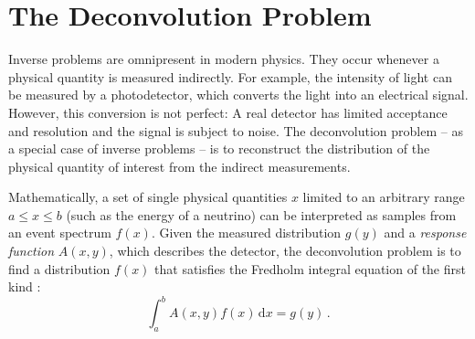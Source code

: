 \section{The Deconvolution Problem} %
Inverse problems are omnipresent in modern physics.
They occur whenever a physical quantity is measured indirectly.
For example,
the intensity of light can be measured by a photodetector,
  which converts the light into an electrical signal.
However,
this conversion is not perfect:
A real detector has limited acceptance and resolution
and the signal is subject to noise.
%
The deconvolution problem
  – as a special case of inverse problems –
  is to reconstruct
    the distribution of the physical quantity of interest
    from the indirect measurements.

Mathematically,
a set of single physical quantities $x$
  limited to an arbitrary range $a \leq x \leq b$
    (such as the energy of a neutrino)
can be interpreted as samples from an event spectrum $f(x)$.
%
Given
  the measured distribution $g(y)$
  and a \emph{response function} $A(x, y)$,
    which describes the detector,
the deconvolution problem is
  to find a distribution $f(x)$ that satisfies
  the Fredholm integral equation of the first kind \cite{deconvolution_fredholm}:
\begin{equation}
  \label{eq:deconvolution_problem:fredholm}
  \int_a^b A(x, y) f(x) \, \mathrm{d}x = g(y) \, .
\end{equation}



